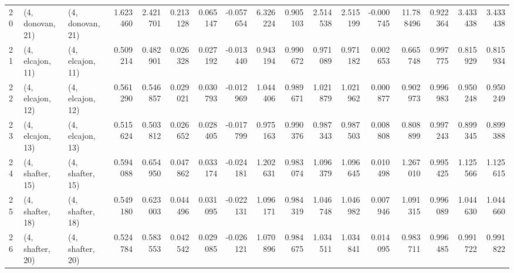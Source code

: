 \begin{tabular}{lllrrrrrrrrrrrrrr}
20 &  (4, donovan, 21) &  (4, donovan, 21) &  1.623460 &  2.421701 &   0.213128 &  0.065147 & -0.057654 &  6.326224 &  0.905103 &   2.514538 &  2.515199 & -0.000745 &  11.788496 &  0.922364 &  3.433438 &  3.433438 \\
21 &  (4, elcajon, 11) &  (4, elcajon, 11) &  0.509214 &  0.482901 &   0.026328 &  0.027192 & -0.013440 &  0.943194 &  0.990672 &   0.971089 &  0.971182 &  0.002653 &   0.665748 &  0.997775 &  0.815929 &  0.815934 \\
22 &  (4, elcajon, 12) &  (4, elcajon, 12) &  0.561290 &  0.546857 &   0.029021 &  0.030793 & -0.012969 &  1.044406 &  0.989671 &   1.021879 &  1.021962 &  0.000877 &   0.902973 &  0.996983 &  0.950248 &  0.950249 \\
23 &  (4, elcajon, 13) &  (4, elcajon, 13) &  0.515624 &  0.503812 &   0.026652 &  0.028405 & -0.017799 &  0.975163 &  0.990376 &   0.987343 &  0.987503 &  0.008808 &   0.808899 &  0.997243 &  0.899345 &  0.899388 \\
24 &  (4, shafter, 15) &  (4, shafter, 15) &  0.594088 &  0.654950 &   0.047862 &  0.033174 & -0.024181 &  1.202631 &  0.983074 &   1.096379 &  1.096645 &  0.010498 &   1.267010 &  0.995425 &  1.125566 &  1.125615 \\
25 &  (4, shafter, 18) &  (4, shafter, 18) &  0.549180 &  0.623003 &   0.044496 &  0.031095 & -0.022131 &  1.096171 &  0.984319 &   1.046748 &  1.046982 &  0.007946 &   1.091315 &  0.996089 &  1.044630 &  1.044660 \\
26 &  (4, shafter, 20) &  (4, shafter, 20) &  0.524784 &  0.583553 &   0.042542 &  0.029085 & -0.026121 &  1.070896 &  0.984675 &   1.034511 &  1.034841 &  0.014095 &   0.983711 &  0.996485 &  0.991722 &  0.991822 \\
\bottomrule
\end{tabular}
